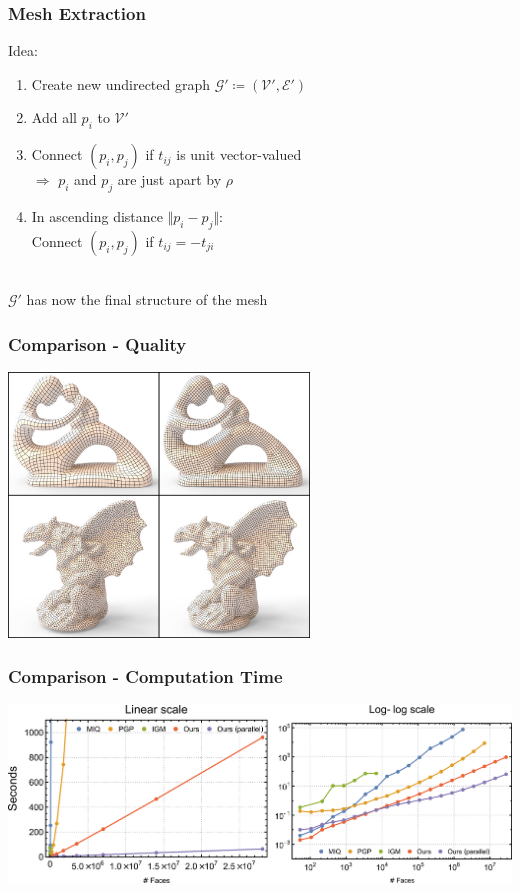 \documentclass[aspectratio=43,sanserif,professionalfonts]{beamer}
\begin{document}
\begin{frame}
	\frametitle{Mesh Extraction}
	Idea:
	\begin{enumerate}
		\item	Create new undirected graph $\mathcal{G}' \coloneqq (\mathcal{V}', \mathcal{E}')$
		\item	Add all $p_i$ to $\mathcal{V'}$
		\pause
		\item	Connect $(p_i, p_j)$ if $t_{ij}$ is unit vector-valued\\
				$\Rightarrow$ $p_i$ and $p_j$ are just apart by $\rho$
		\pause
		\item	In ascending distance $\Vert p_i - p_j \Vert$:\\
				Connect $(p_i, p_j)$ if $t_{ij} = -t_{ji}$
	\end{enumerate}
	\pause
	~\\
	$\mathcal{G}'$ has now the final structure of the mesh
\end{frame}

\begin{frame}
	\frametitle{Comparison - Quality}
	\centering
	\includegraphics[width=0.6\textwidth]{img/quality.png}
\end{frame}

\begin{frame}
	\frametitle{Comparison - Computation Time}
	\centering
	\includegraphics[width=\textwidth]{img/computation-time.png}
\end{frame}
\end{document}
